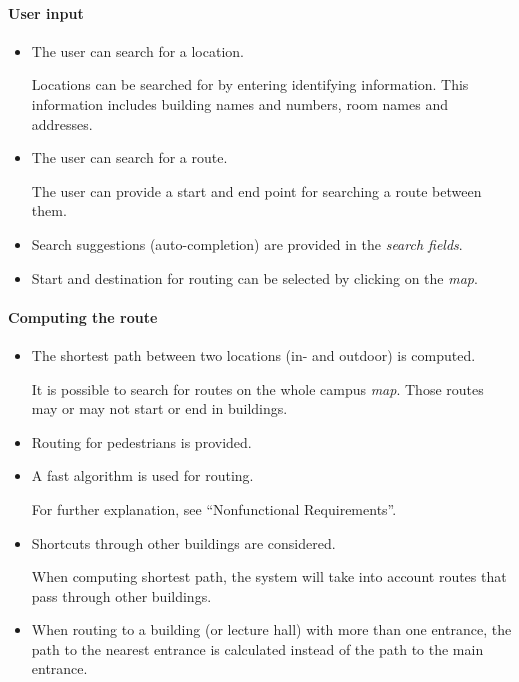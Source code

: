 \paragraph{User input}
\begin{itemize}
	\item The user can search for a location.
		\begin{addmargin}[7mm]{0mm}
			Locations can be searched for by entering identifying information. This information includes building names and numbers, room names and addresses.
		\end{addmargin}
	\item The user can search for a route.
		\begin{addmargin}[7mm]{0mm}
			The user can provide a start and end point for searching a route between them.
		\end{addmargin}
	\item Search suggestions (auto-completion) are provided in the \textit{search fields}.
	\item Start and destination for routing can be selected by clicking on the \textit{map}.
\end{itemize}

\paragraph{Computing the route}
\begin{itemize}
	\item The shortest path between two locations (in- and outdoor) is computed.
		\begin{addmargin}[7mm]{0mm}
			It is possible to search for routes on the whole campus \textit{map}. Those routes may or may not start or end in buildings.
		\end{addmargin}
	\item Routing for pedestrians is provided.
	\item A fast algorithm is used for routing.
		\begin{addmargin}[7mm]{0mm}
			 For further explanation, see ``Nonfunctional Requirements''.
		\end{addmargin}
		\item Shortcuts through other buildings are considered.
		\begin{addmargin}[7mm]{0mm}
			 When computing shortest path, the system will take into account routes that pass through other buildings.
		\end{addmargin}
	\item When routing to a building (or lecture hall) with more than one entrance, the path to the nearest entrance is calculated instead of the path to the main entrance.
\end{itemize}



